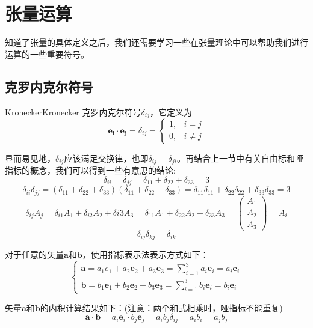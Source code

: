 \documentclass{ctexart}
\begin{document}
\section{张量运算}
     知道了张量的具体定义之后，我们还需要学习一些在张量理论中可以帮助我们进行运算的一些重要符号。
\subsection{克罗内克尔符号}
    \begin{定义}{Kronecker}{Kronecker}
    克罗内克尔符号$\delta_{ij}$，它定义为\\
    $$
    \boldsymbol{{e}_{i}} \cdot \boldsymbol{{e}_{j}}=\delta_{ij}=\left\{\begin{array}{ll}
    1, & i=j  \\
    0, & i \neq j 
    \end{array}\right.
    $$
    \end{定义}
    显而易见地，$\delta_{ij}$应该满足交换律，也即$\delta_{ij}=\delta_{ji}$。再结合上一节中有关自由标和哑指标的概念，我们可以得到一些有意思的结论:
    $$ \delta_{ii} = \delta_{jj} =\delta_{11} +\delta_{22} +\delta_{33}=3 $$ 
    $$ \delta_{ii}\delta_{jj}=(\delta_{11} +\delta_{22} +\delta_{33})(\delta_{11} +\delta_{22} +\delta_{33})=\delta_{11}\delta_{11}+\delta_{22}\delta_{22}+\delta_{33}\delta_{33}=3 $$
    $$
    \delta_{ij}A_{j}=\delta_{i1}A_1+\delta_{i2}A_2+\delta{i3}A_3=\delta_{11} A_{1}+\delta_{22} A_{2}+\delta_{33} A_{3}=\left(\begin{array}{c}
    A_{1} \\
    A_{2} \\
    A_{3}
    \end{array}\right)=A_{i}
    $$
    $$ \delta_{ij}\delta_{kj}=\delta_{ik} $$
    \par
    对于任意的矢量$\boldsymbol{a}$和$\boldsymbol{b}$，使用指标表示法表示方式如下：
    $$
    \left\{\begin{array}{l}
    \boldsymbol{a}=a_{1} e_{1}+a_{2} \boldsymbol{e}_{2}+a_{3} \boldsymbol{e}_{3}=\sum_{i=1}^{3} a_{i} \boldsymbol{e}_{i}=a_{i} \boldsymbol{e}_{i} \\
    \boldsymbol{b}=b_{1} \boldsymbol{e}_{1}+b_{2} \boldsymbol{e}_{2}+b_{3} \boldsymbol{e}_{3}=\sum_{i=1}^{3} b_{i} \boldsymbol{e}_{i}=b_{i} \boldsymbol{e}_{i}
    \end{array}\right.
    $$
    \par
    矢量$\boldsymbol{a}$和$\boldsymbol{b}$的内积计算结果如下：(注意：两个和式相乘时，哑指标不能重复)
    $$
    \boldsymbol{a} \cdot \boldsymbol{b}=a_{i} \boldsymbol{e}_{i} \cdot b_{j} \boldsymbol{e}_{j}=a_{i}b_{j}\delta_{ij}=a_{i}b_{i}=a_{j}b_{j}
    $$
\end{document}
